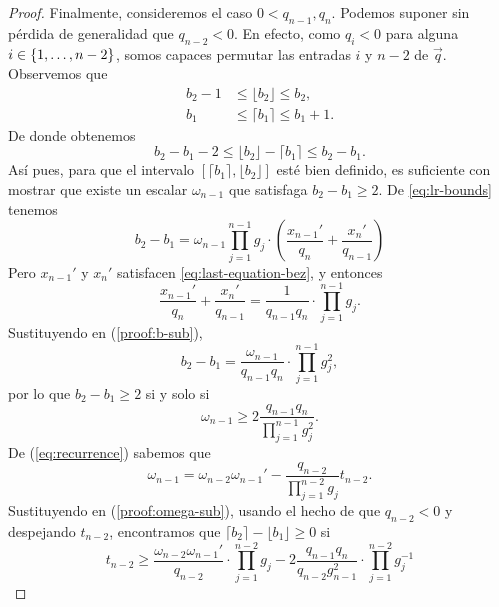\begin{proof}
	Finalmente, consideremos el caso $0 < q_{n - 1}, q_n$. Podemos suponer sin pérdida de
	generalidad que $q_{n - 2} < 0$. En efecto, como $q_i < 0$ para alguna $i \in \lbrace 1, \ldots,
	n - 2 \rbrace$, somos capaces permutar las entradas $i$ y $n - 2$ de
	$\vec{q}$. Observemos que
	\begin{align*}
		b_2 - 1 &\leq \lfloor b_2 \rfloor \leq b_2, \\
		b_1 &\leq \lceil b_1 \rceil \leq b_1 + 1.
	\end{align*}
	De donde obtenemos
	\begin{equation*}
		b_2 - b_1 - 2 \leq \lfloor b_2 \rfloor - \lceil b_1 \rceil \leq b_2 - b_1.
	\end{equation*}
	Así pues, para que el intervalo $[\lceil b_1 \rceil, \lfloor b_2 \rfloor]$ esté bien definido,
	es suficiente con mostrar que existe un escalar $\omega_{n - 1}$ que satisfaga $b_2 - b_1 \geq
	2$. De \eqref{eq:lr-bounds} tenemos
	\begin{equation}
		\label{proof:b-sub}
		b_2 - b_1 = \omega_{n - 1}\prod_{j = 1}^{n-1}g_j \cdot
			\left(\frac{x_{n-1}'}{q_n} + \frac{x_n'}{q_{n - 1}}\right)
	\end{equation}
	Pero $x_{n-1}'$ y $x_n'$ satisfacen \eqref{eq:last-equation-bez}, y entonces
	\begin{equation*}
		\frac{x_{n-1}'}{q_n} + \frac{x_n'}{q_{n - 1}} = \frac{1}{q_{n-1}q_n} \cdot \prod_{j =
		1}^{n-1}g_j.
	\end{equation*}
	Sustituyendo en (\ref{proof:b-sub}),
	\begin{equation*}
		b_2 - b_1 = \frac{\omega_{n-1}}{q_{n-1}q_n} \cdot \prod_{j=1}^{n-1}g_j^2,
	\end{equation*}
	por lo que $b_2 - b_1 \geq 2$ si y solo si
	\begin{equation}
		\label{proof:omega-sub}
		\omega_{n-1} \geq 2\frac{q_{n-1}q_n}{\prod_{j=1}^{n-1}g_j^2}.
	\end{equation}
	De (\ref{eq:recurrence}) sabemos que
	\begin{equation*}
		\omega_{n-1} = \omega_{n-2}\omega_{n-1}' -
		\frac{q_{n-2}}{\prod_{j=1}^{n-2}g_j}t_{n-2}.
	\end{equation*}
	Sustituyendo en (\ref{proof:omega-sub}), usando el hecho de que $q_{n-2} < 0$ y despejando
	$t_{n-2}$, encontramos que $\lceil b_2 \rceil - \lfloor b_1 \rfloor \geq 0$ si
	\begin{equation*}
		t_{n-2} \geq \frac{\omega_{n-2}\omega_{n-1}'}{q_{n-2}}\cdot\prod_{j=1}^{n-2}g_j
		- 2\frac{q_{n-1}q_n}{q_{n-2}g_{n-1}^2}\cdot
		\prod_{j=1}^{n-2}g_j^{-1}

\end{equation*}
\end{proof}
